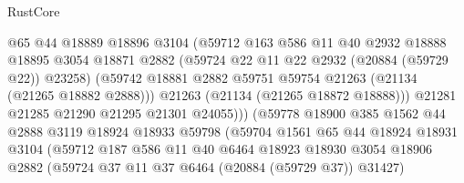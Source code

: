 \begin{lexlean}{RustCore}
\begin{coremodule}
                                  @65
                                  @44
                                  @18889
                                  @18896
                                  @3104
                                  (@59712
                                    @163
                                    @586
                                    @11
                                    @40
                                    @2932
                                    @18888
                                    @18895
                                    @3054
                                    @18871
                                    @2882
                                    (@59724 @22 @11 @22 @2932 (@20884 (@59729 @22)) @23258)
                                    (@59742
                                      @18881
                                      @2882
                                      @59751
                                      @59754
                                      @21263
                                      (@21134 (@21265 @18882 @2888)))
                                    @21263
                                    (@21134 (@21265 @18872 @18888)))
                                  @21281
                                  @21285
                                  @21290
                                  @21295
                                  @21301
                                  @24055)))
                            (@59778
                              @18900
                              @385
                              @1562
                              @44
                              @2888
                              @3119
                              @18924
                              @18933
                              @59798
                              (@59704
                                @1561
                                @65
                                @44
                                @18924
                                @18931
                                @3104
                                (@59712
                                  @187
                                  @586
                                  @11
                                  @40
                                  @6464
                                  @18923
                                  @18930
                                  @3054
                                  @18906
                                  @2882
                                  (@59724 @37 @11 @37 @6464 (@20884 (@59729 @37)) @31427)

\end{coremodule}
\end{lexlean}
